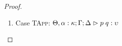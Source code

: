 \begin{proof}
\begin{enumerate}
  First, the syntax:
  \begin{tabbedproof}
    \oo By inversion, $\judgeA[\Theta, \alpha:\kappa, \beta:\kappa'; \Gamma; \Delta]{p}{\upsilon}$ \\
    \oo By induction, $\judgeA[\Theta, \beta:\kappa'; {[\tau/\alpha]}\Gamma; {[\tau/\alpha]}\Delta]{{[\tau/\alpha]}p}{{[\tau/\alpha]}\upsilon}$ \\
    \oo By rule, $\judgeA[\Theta; {[\tau/\alpha]}\Gamma; {[\tau/\alpha]}\Delta]{\pfunall{\beta}{\kappa'}{{[\tau/\alpha]}p}}{\forallsort{\beta}{\kappa'}{{[\tau/\alpha]}\upsilon}}$ \\
    \oo By def of subst, $\judgeA[\Theta; {[\tau/\alpha]}\Gamma; {[\tau/\alpha]}\Delta]{{[\tau/\alpha]}(\pfunall{\beta}{\kappa'}{p})}{{[\tau/\alpha]}\forallsort{\beta}{\kappa'}{\upsilon}}$ \\
  \end{tabbedproof}
  For semantics, consider $\interp{\judgeA[\Theta; {[\tau/\alpha]}\Gamma; {[\tau/\alpha]}\Delta]{{[\tau/\alpha]}(\pfun{\beta}{\kappa'}{p})}{{[\tau/\alpha]}(\forallsort{\beta}{\kappa'}{\upsilon})}}\;\theta\;\gamma\;\delta$ \\
  \begin{eqnproof}
          {Semantics}
          {Induction}
          {Semantics}
  \end{eqnproof}
  The correctness of the application of $\gamma$ and $\delta$ follows from the equations for contexts
  under substitution. We also silently permuted the context at the second step, and made use of the fact
  that $\beta$ is not free in $\Gamma$ or $\Delta$.

\item Case \textsc{TApp}: $\judgeA[\Theta, \alpha:\kappa; \Gamma; \Delta]{p\;q}{\upsilon}$
  

\end{enumerate}
\end{proof}
